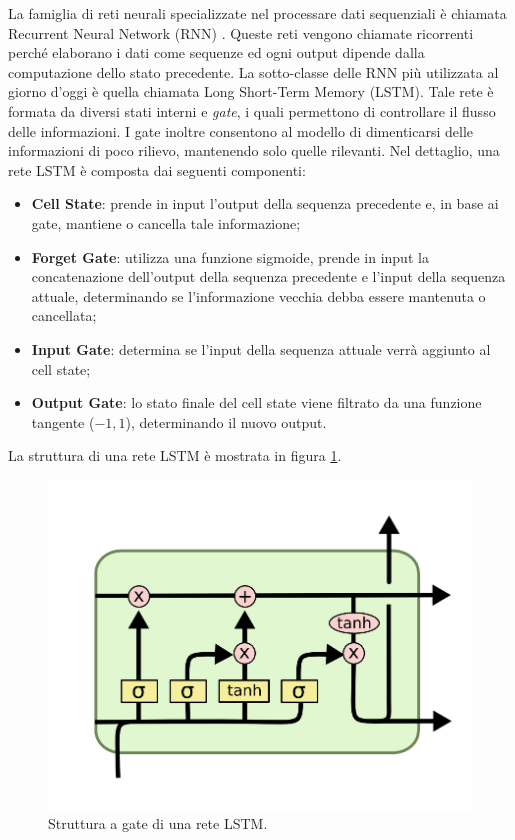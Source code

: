 \documentclass[11pt]{report}
\begin{document}
La famiglia di reti neurali specializzate nel processare dati sequenziali è chiamata Recurrent Neural Network (RNN) \cite{rumelhart1985learning}. Queste reti vengono chiamate ricorrenti perché elaborano i dati come sequenze ed ogni output dipende dalla computazione dello stato precedente. La sotto-classe delle RNN più utilizzata al giorno d'oggi è quella chiamata Long Short-Term Memory (LSTM)\cite{hochreiter1997long}. Tale rete è formata da diversi stati interni e \textit{gate}, i quali permettono di controllare il flusso delle informazioni. I gate inoltre consentono al modello di dimenticarsi delle informazioni di poco rilievo, mantenendo solo quelle rilevanti. Nel dettaglio, una rete LSTM è composta dai seguenti componenti:
\begin{itemize}
    \item \textbf{Cell State}: prende in input l'output della sequenza precedente e, in base ai gate, mantiene o cancella tale informazione;
    
    \item \textbf{Forget Gate}: utilizza una funzione sigmoide, prende in input la concatenazione dell'output della sequenza precedente e l'input della sequenza attuale, determinando se l'informazione vecchia debba essere mantenuta o cancellata;
    
    \item \textbf{Input Gate}: determina se l'input della sequenza attuale verrà aggiunto al cell state;
    
    \item \textbf{Output Gate}: lo stato finale del cell state viene filtrato da una funzione tangente ($-1,1$), determinando il nuovo output.
    
\end{itemize}
La struttura di una rete LSTM è mostrata in figura \ref{fig:lstm}.


\begin{figure}[h]
    \centering
    \includegraphics[scale = 0.7]{img/lstm.png}
    \caption[Struttura a gate di una rete LSTM.]{Struttura a gate di una rete LSTM.\footnotemark}
    \label{fig:lstm}
\end{figure}
\end{document}
